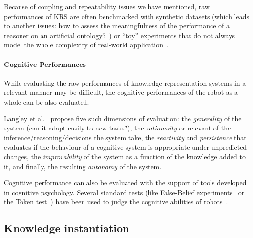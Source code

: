 Because of coupling and repeatability issues we have mentioned, raw
performances of KRS are often benchmarked with synthetic datasets (which leads
to another issues: how to assess the meaningfulness of the performance of a
reasoner on an artificial ontology?~\cite{Bail2010}) or ``toy'' experiments
that do not always model the whole complexity of real-world
application~\cite{Chong2009}.

\paragraph{Cognitive Performances} While evaluating the raw performances of
knowledge representation systems in a relevant manner may be difficult, the cognitive
performances of the robot as a whole can be also evaluated.

Langley et al.~\cite{Langley2006} propose five such dimensions of evaluation:
the \emph{generality} of the system (can it adapt easily to new tasks?), the
\emph{rationality} or relevant of the inference/reasoning/decisions the system
take, the \emph{reactivity} and \emph{persistence} that evaluates if the
behaviour of a cognitive system is appropriate under unpredicted changes, the
\emph{improvability} of the system as a function of the knowledge added to it,
and finally, the resulting \emph{autonomy} of the system.

Cognitive performance can also be evaluated with the support of tools developed
in cognitive psychology. Several standard tests (like False-Belief
experiments~\cite{Leslie2000} or the Token test~\cite{DiSimoni1978}) have been
used to judge the cognitive abilities of robots~\cite{Mavridis2006,
Breazeal2006}.
\subsection{Knowledge instantiation}

\begin{scriptsize}
\begin{center}
\end{center}
\end{scriptsize}

